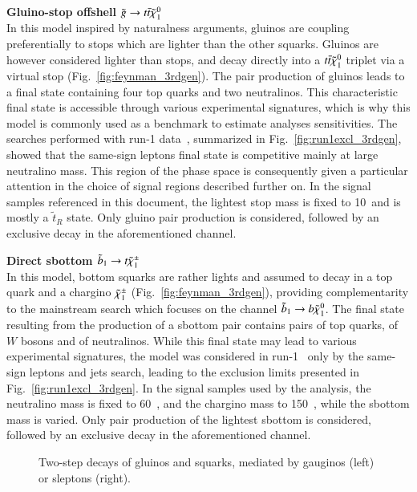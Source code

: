 \par{\bf Gluino-stop offshell $\tilde{g} \rightarrow t\bar t\tilde{\chi}_{1}^{0}$\\}
In this model inspired by naturalness arguments, gluinos are coupling preferentially to stops which are lighter than the other squarks. 
Gluinos are however considered lighter than stops, and decay directly into a $t\bar t\tilde{\chi}_{1}^{0}$ triplet via a virtual stop (Fig.~\ref{fig:feynman_3rdgen}). 
The pair production of gluinos leads to a final state containing four top quarks and two neutralinos. 
This characteristic final state is accessible through various experimental signatures, which is why this model 
is commonly used as a benchmark to estimate analyses sensitivities. 
The searches performed with run-1 data~\cite{DraftSquarkGluinoSummaryPaper}, 
summarized in Fig.~\ref{fig:run1excl_3rdgen}, showed that the same-sign leptons final state is competitive mainly at large neutralino mass. 
This region of the phase space is consequently given a particular attention in the choice of signal regions described further on. 
In the signal samples referenced in this document, the lightest stop mass is fixed to 10~\TeV and is mostly a $\widetilde{t}_R$ state. 
Only gluino pair production is considered, followed by an exclusive decay in the aforementioned channel. 
\\
\par{\bf Direct sbottom $\tilde{b}_{1}\rightarrow t\tilde{\chi}_{1}^{\pm}$\\}
In this model, bottom squarks are rather lights and assumed to decay in a top quark and a chargino $\tilde{\chi}_{1}^{\pm}$ (Fig.~\ref{fig:feynman_3rdgen}), 
providing complementarity to the mainstream search which focuses on the channel $\tilde{b}_{1}\rightarrow b\tilde{\chi}_{1}^{0}$. 
The final state resulting from the production of a sbottom pair contains pairs of top quarks, of $W$ bosons and of neutralinos. 
While this final state may lead to various experimental signatures, 
the model was considered in run-1~\cite{DraftSquarkGluinoSummaryPaper} 
only by the same-sign leptons and jets search, leading to the exclusion limits presented in Fig.~\ref{fig:run1excl_3rdgen}. 
In the signal samples used by the analysis, the neutralino mass is fixed to 60~\GeV, and the chargino mass to 150~\GeV, while the sbottom mass is varied. 
Only pair production of the lightest sbottom is considered, followed by an exclusive decay in the aforementioned channel. \\


\begin{figure}[h!]
\caption{Two-step decays of gluinos and squarks, mediated by gauginos (left) or sleptons (right).}
\label{fig:feynman_1stgen}
\end{figure}

